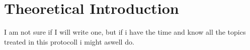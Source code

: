 \chapter{Theoretical Introduction}
\label{cha:Theorie}
I am not sure if I will write one, but if i have the time and know all the topics treated in this protocoll i might aswell do. 